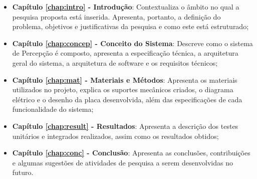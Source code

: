 \begin{itemize}

  \item \textbf{Capítulo \ref{chap:intro} - Introdução}: Contextualiza o âmbito no qual a pesquisa proposta está inserida. Apresenta, portanto, a definição do problema, objetivos e justificativas da pesquisa e como este \thetypeworkthree está estruturado;

  \item \textbf{Capítulo \ref{chap:concep} - Conceito do Sistema}: Descreve como o sistema de Percepção é composto, apresenta a especificação técnica, a arquitetura geral do sistema, a arquitetura de software e os requisitos técnicos;
  
  \item \textbf{Capítulo \ref{chap:mat} - Materiais e Métodos}: Apresenta os materiais utilizados no projeto, explica os suportes mecânicos criados, o diagrama elétrico e o desenho da placa desenvolvida, além das especificações de cada funcionalidade do sistema;%
  
  \item \textbf{Capítulo \ref{chap:result} - Resultados}: Apresenta a descrição dos testes unitários e integrados realizados, assim como os resultados obtidos;
 
  \item \textbf{Capítulo \ref{chap:conc} - Conclusão}: Apresenta as conclusões, contribuições e algumas sugestões de atividades de pesquisa a serem desenvolvidas no futuro.

\end{itemize}

